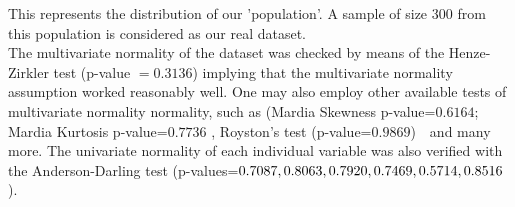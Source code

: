 \documentclass{article}
\begin{document}
This represents the distribution of our 'population'. A sample of size 300
from this population is considered as our real dataset.\\

The multivariate normality of the dataset was checked by means of the
Henze-Zirkler test (p-value $=0.3136$) implying
that the multivariate normality assumption worked reasonably well. One may
also employ other available tests of multivariate normality normality, such
as (Mardia Skewness p-value=$0.6164$; Mardia Kurtosis p-value=$0.7736$
, Royston's test (p-value=$0.9869$)\ \ and
many more. The univariate normality of each individual variable was also
verified with the Anderson-Darling test (p-values=$%
0.7087,0.8063,0.7920,0.7469,\\
0.5714,0.8516$).
\end{document}
